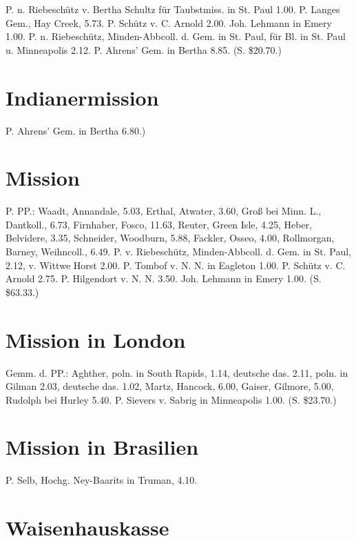 P. n. Riebeschütz v. Bertha Schultz für Taubstmiss. in St. Paul 1.00. P. Langes Gem., Hay Creek, 5.73. P. Schütz v. C. Arnold 2.00. Joh. Lehmann in Emery 1.00. P. n. Riebeschütz, Minden-Abbcoll. d. Gem. in St. Paul, für Bl. in St. Paul u. Minneapolis 2.12. P. Ahrens’ Gem. in Bertha 8.85. (S. \$20.70.)

\section{Indianermission}

P. Ahrens’ Gem. in Bertha 6.80.)

\section{Mission}

P. PP.: Waadt, Annandale, 5.03, Erthal, Atwater, 3.60, Groß bei Minn. L., Dantkoll., 6.73, Firnhaber, Fosco, 11.63, Reuter, Green Isle, 4.25, Heber, Belvidere, 3.35, Schneider, Woodburn, 5.88, Fackler, Osseo, 4.00, Rollmorgan, Barney, Weihncoll., 6.49. P. v. Riebeschütz, Minden-Abbcoll. d. Gem. in St. Paul, 2.12, v. Wittwe Horst 2.00. P. Tombof v. N. N. in Eagleton 1.00. P. Schütz v. C. Arnold 2.75. P. Hilgendort v. N. N. 3.50. Joh. Lehmann in Emery 1.00. (S. \$63.33.)

\section{Mission in London}

Gemm. d. PP.: Aghther, poln. in South Rapids, 1.14, deutsche das. 2.11, poln. in Gilman 2.03, deutsche das. 1.02, Martz, Hancock, 6.00, Gaiser, Gilmore, 5.00, Rudolph bei Hurley 5.40. P. Sievers v. Sabrig in Minneapolis 1.00. (S. \$23.70.)

\section{Mission in Brasilien}

P. Selb, Hochg. Ney-Baarits in Truman, 4.10.

\section{Waisenhauskasse}


